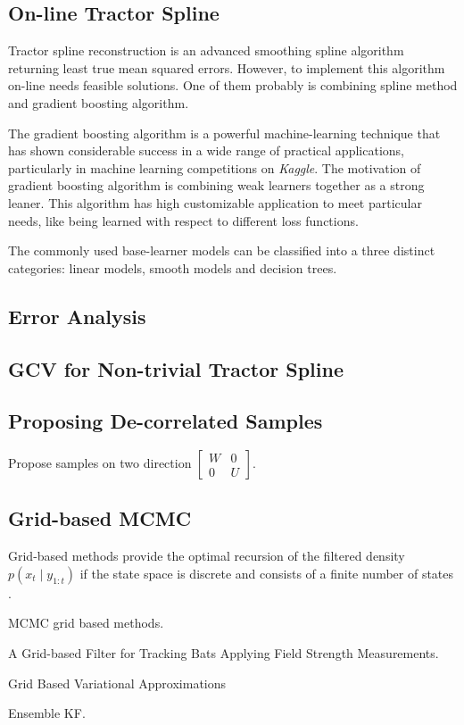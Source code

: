 

\subsection*{On-line Tractor Spline}

Tractor spline reconstruction is an advanced smoothing spline algorithm returning least true mean squared errors. However, to implement this algorithm on-line needs feasible solutions. One of them probably is combining spline method and gradient boosting algorithm. 

The gradient boosting algorithm is a powerful machine-learning technique that has shown considerable success in a wide range of practical applications, particularly in machine learning competitions on \textit{Kaggle}. The motivation of gradient boosting algorithm is combining weak learners together as a strong leaner. This algorithm has high customizable application to meet particular needs, like being learned with respect to different loss functions. 

The commonly used base-learner models can be classified into a three distinct categories: linear models, smooth models and decision trees. 


\subsection*{Error Analysis}


\subsection*{GCV for Non-trivial Tractor Spline}


\subsection*{Proposing De-correlated Samples}

Propose samples on two direction $\begin{bmatrix}
W & 0 \\ 0 & U
\end{bmatrix}$.


\subsection*{Grid-based MCMC}


Grid-based methods provide the optimal recursion of the filtered density $p(x_t\mid y_{1:t})$ if the state space is discrete and consists of a finite number of states \cite{ristic2004beyond}. 

MCMC grid based methods. 

A Grid-based Filter for Tracking Bats Applying
Field Strength Measurements.


Grid Based Variational Approximations

Ensemble KF. 